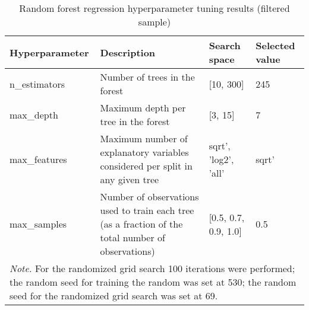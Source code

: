 \begin{table}[htbp]
    \begin{spacing}{1.5}
    \centering
    \small
    \caption{Random forest regression hyperparameter tuning results (filtered sample)}
    \label{tab:hyperparameter_tuning_results_rfr_filtered_sample}
    \begin{tabularx}{\textwidth}{p{3cm}p{6cm}p{3cm}p{2cm}}
        \toprule
        \toprule
        \textbf{Hyperparameter} & \textbf{Description} & \textbf{Search space} & \multicolumn{1}{l}{\textbf{Selected value}} \\
        \midrule
        n\_estimators & Number of trees in the forest & [10, 300] & 245 \\
        max\_depth & Maximum depth per tree in the forest & [3, 15] & 7 \\
        max\_features & Maximum number of explanatory variables considered per split in any given tree & sqrt', 'log2', 'all' & \multicolumn{1}{l}{sqrt'} \\
        max\_samples & Number of observations used to train each tree (as a fraction of the total number of observations) & [0.5, 0.7, 0.9, 1.0] & 0.5 \\
        \bottomrule
        \bottomrule
        \multicolumn{4}{X}{\footnotesize\textit{Note.} For the randomized grid search 100 iterations were performed; the random seed for training the random was set at 530; the random seed for the randomized grid search was set at 69.}
    \end{tabularx}
    \end{spacing}
\end{table}
